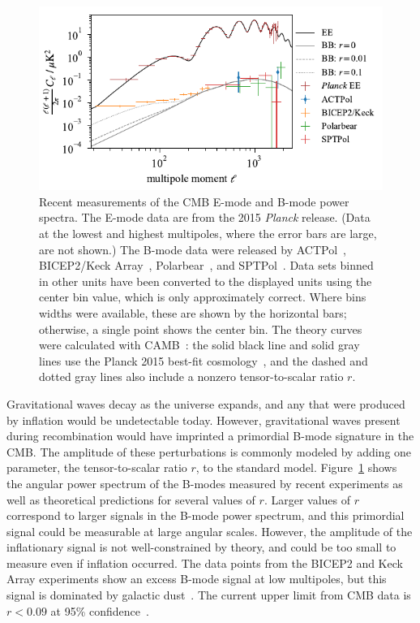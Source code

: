 \begin{figure}[htb]
\centering
\includegraphics[width=\textwidth]{cmb/cmb_polarization_power_spectrum.pdf}
\caption[Recent measurements of the CMB E-mode and B-mode power spectra.]
{Recent measurements of the CMB E-mode and B-mode power spectra.
The E-mode data are from the 2015 \textit{Planck} release.
(Data at the lowest and highest multipoles, where the error bars are large, are not shown.)
The B-mode data were released by ACTPol~\autocite{ACTPol2017JCAP},
BICEP2/Keck Array~\autocite{BK2016PRL},
Polarbear~\autocite{Polarbear2017ApJ}, 
and SPTPol~\autocite{SPTPol2015ApJ}.
Data sets binned in other units have been converted to the displayed units using the center bin value, which is only approximately correct.
Where bins widths were available, these are shown by the horizontal bars; otherwise, a single point shows the center bin.
The theory curves were calculated with CAMB~\autocite{CAMB}: the solid black line and solid gray lines use the Planck 2015 best-fit cosmology~\autocite{Planck2015XIII}, and the dashed and dotted gray lines also include a nonzero tensor-to-scalar ratio $r$.}
\label{fig:cmb_polarization_power_spectrum}
\end{figure}

Gravitational waves decay as the universe expands, and any that were produced by inflation would be undetectable today.
However, gravitational waves present during recombination would have imprinted a primordial B-mode signature in the CMB.
The amplitude of these perturbations is commonly modeled by adding one parameter, the tensor-to-scalar ratio $r$, to the standard model.
Figure~\ref{fig:cmb_polarization_power_spectrum} shows the angular power spectrum of the B-modes measured by recent experiments as well as theoretical predictions for several values of $r$.
Larger values of $r$ correspond to larger signals in the B-mode power spectrum, and this primordial signal could be measurable at large angular scales.
However, the amplitude of the inflationary signal is not well-constrained by theory, and could be too small to measure even if inflation occurred.
The data points from the BICEP2 and Keck Array experiments show an excess B-mode signal at low multipoles, but this signal is dominated by galactic dust~\autocite{BKP2015PRL}.
The current upper limit from CMB data is $r < 0.09$ at 95\% confidence~\autocite{BK2016PRL}.


